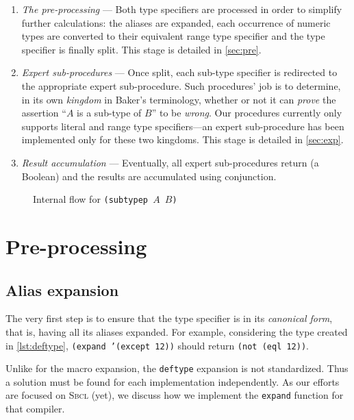 \documentclass[format=sigconf]{acmart}
\newcommand\code[2][\small]{\sloppy\texttt{#1#2}}
\theoremstyle{definition}
\newcommand\sbcl{\textsc{Sbcl}}
\begin{document}
\begin{enumerate}
\item \emph{The pre-processing} --- Both type specifiers are processed in order to
  simplify further calculations: the aliases are expanded, each occurrence of
  numeric types are converted to their equivalent range type specifier and the
  type specifier is finally split. This stage is detailed in %
  \vref{sec:pre}.
\item \emph{Expert sub-procedures} --- Once split, each sub-type specifier is
  redirected to the appropriate expert sub-procedure. Such procedures' job is to
  determine, in its own \emph{kingdom} in Baker's terminology, whether or not it
  can \emph{prove} the assertion ``$A$ is a sub-type of $B$'' to be \emph{wrong}.
  Our procedures currently only supports literal and range type specifiers---an
  expert sub-procedure has been implemented only for these two kingdoms. This
  stage is detailed in \vref{sec:exp}.
\item \emph{Result accumulation} --- Eventually, all expert sub-procedures
  return (a Boolean) and the results are accumulated using conjunction.
\end{enumerate}

\begin{figure}
  \centering
  
  \caption{Internal flow for \code{(subtypep $A$ $B$)}}
  \label{fig:flow}
\end{figure}

\section{Pre-processing}
\label{sec:pre}
\subsection{Alias expansion}
The very first step is to ensure that the type specifier is in its
\emph{canonical form}, that is, having all its aliases expanded. For example,
considering the type created in \vref{lst:deftype},
\code{(expand '(except 12))} should return \code{(not (eql 12))}.

Unlike for the macro expansion, the \code{deftype} expansion is not
standardized. Thus a solution must be found for each implementation
independently. As our efforts are focused on \sbcl{} (yet), we discuss how we
implement the \code{expand} function for that compiler.
\end{document}
